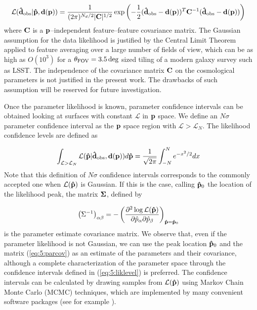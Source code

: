 \begin{equation}
\label{eq:5:gaussfeatlik}
\mathcal{L}(\mathbf{\hat{d}}_{\rm obs}\vert\mathbf{\hat{p}},\mathbf{d}(\mathbf{p})) = \frac{1}{(2\pi)^{N_d/2}\vert\mathbf{C}\vert^{1/2}}\exp\left(-\frac{1}{2}(\mathbf{\hat{d}}_{\rm obs}-\mathbf{d}(\mathbf{p}))^T\mathbf{C}^{-1}(\mathbf{\hat{d}}_{\rm obs}-\mathbf{d}(\mathbf{p}))\right) 
\end{equation}
%
where $\mathbf{C}$ is a $\mathbf{p}$--independent feature--feature covariance matrix. The Gaussian assumption for the data likelihood is justified by the Central Limit Theorem applied to feature averaging over a large number of fields of view, which can be as high as $O(10^3)$ for a $\theta_{\rm FOV}=3.5\,{\rm deg}$ sized tiling of a modern galaxy survey such as LSST. The independence of the covariance matrix $\mathbf{C}$ on the cosmological parameters is not justified in the present work. The drawbacks of such assumption will be reserved for future investigation. 

Once the parameter likelihood is known, parameter confidence intervals can be obtained looking at surfaces with constant $\mathcal{L}$ in $\mathbf{p}$ space. We define an $N\sigma$ parameter confidence interval as the $\mathbf{p}$ space region with $\mathcal{L}>\mathcal{L}_N$. The likelihood confidence levels are defined as 

\begin{equation}
\label{eq:5:liklevel}
\int_{\mathcal{L}>\mathcal{L}_N}\mathcal{L}(\mathbf{\hat{p}}\vert\mathbf{\hat{d}}_{\rm obs},\mathbf{d}(\mathbf{p})) d\mathbf{\hat{p}} = \frac{1}{\sqrt{2\pi}}\int_{-N}^Ne^{-x^2/2}dx
\end{equation}  
%
Note that this definition of $N\sigma$ confidence intervals corresponds to the commonly accepted one when $\mathcal{L}(\mathbf{\hat{p}})$ is Gaussian. If this is the case, calling $\mathbf{\hat{p}}_0$ the location of the likelihood peak, the matrix $\mathbf{\Sigma}$, defined by

\begin{equation}
\label{eq:5:parcov}
\left(\Sigma^{-1}\right)_{\alpha\beta} = -\left(\frac{\partial^2\log\mathcal{L}(\mathbf{\hat{p}})}{\partial\hat{p}_\alpha\partial\hat{p}_\beta}\right)_{\mathbf{\hat{p}}=\mathbf{\hat{p}}_0}
\end{equation}
%
is the parameter estimate covariance matrix. We observe that, even if the parameter likelihood is not Gaussian, we can use the peak location $\mathbf{\hat{p}}_0$ and the matrix (\ref{eq:5:parcov}) as an estimate of the parameters and their covariance, although a complete characterization of the parameter space through the confidence intervals defined in (\ref{eq:5:liklevel}) is preferred. The confidence intervals can be calculated by drawing samples from $\mathcal{L}(\mathbf{\hat{p}})$ using Markov Chain Monte Carlo (MCMC) techniques, which are implemented by many convenient software packages (see for example \citep{emcee}). 

